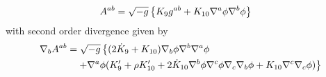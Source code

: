 \begin{equation}
\begin{split}
  A^{ab}&=\sqrt{-g}\left\{K_9g^{ab}+K_{10}\nabla^{a}\phi\nabla^b\phi  \right\}
\end{split}
\end{equation}
with second order divergence given by
\begin{align}
   \nabla_b A^{ab}&= \sqrt{-g}\left\{(2\dot{K}_9+K_{10})\nabla_b\phi \nabla^b\nabla^{a}\phi\right. \\
  &\quad\left.+\nabla^{a}\phi (K_9'+\rho K_{10}'+2\dot{K}_{10}\nabla^b\phi \nabla^c\phi \nabla_c\nabla_b\phi +K_{10}\nabla^c\nabla_c\phi )\right\}
\end{align}





























































